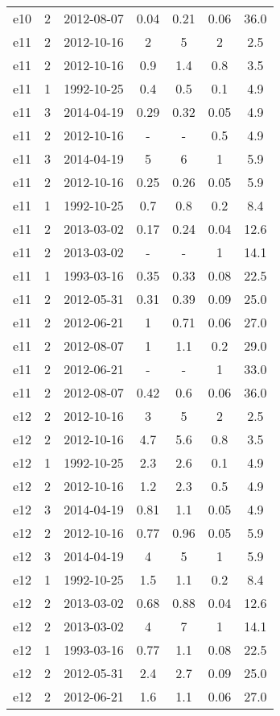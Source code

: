 \begin{table*}[htp]
\begin{tabular}{ccccccc}
e10 & 2 & 2012-08-07 & 0.04 & 0.21 & 0.06 & 36.0 \\
e11 & 2 & 2012-10-16 & 2 & 5 & 2 & 2.5 \\
e11 & 2 & 2012-10-16 & 0.9 & 1.4 & 0.8 & 3.5 \\
e11 & 1 & 1992-10-25 & 0.4 & 0.5 & 0.1 & 4.9 \\
e11 & 3 & 2014-04-19 & 0.29 & 0.32 & 0.05 & 4.9 \\
e11 & 2 & 2012-10-16 & - & - & 0.5 & 4.9 \\
e11 & 3 & 2014-04-19 & 5 & 6 & 1 & 5.9 \\
e11 & 2 & 2012-10-16 & 0.25 & 0.26 & 0.05 & 5.9 \\
e11 & 1 & 1992-10-25 & 0.7 & 0.8 & 0.2 & 8.4 \\
e11 & 2 & 2013-03-02 & 0.17 & 0.24 & 0.04 & 12.6 \\
e11 & 2 & 2013-03-02 & - & - & 1 & 14.1 \\
e11 & 1 & 1993-03-16 & 0.35 & 0.33 & 0.08 & 22.5 \\
e11 & 2 & 2012-05-31 & 0.31 & 0.39 & 0.09 & 25.0 \\
e11 & 2 & 2012-06-21 & 1 & 0.71 & 0.06 & 27.0 \\
e11 & 2 & 2012-08-07 & 1 & 1.1 & 0.2 & 29.0 \\
e11 & 2 & 2012-06-21 & - & - & 1 & 33.0 \\
e11 & 2 & 2012-08-07 & 0.42 & 0.6 & 0.06 & 36.0 \\
e12 & 2 & 2012-10-16 & 3 & 5 & 2 & 2.5 \\
e12 & 2 & 2012-10-16 & 4.7 & 5.6 & 0.8 & 3.5 \\
e12 & 1 & 1992-10-25 & 2.3 & 2.6 & 0.1 & 4.9 \\
e12 & 2 & 2012-10-16 & 1.2 & 2.3 & 0.5 & 4.9 \\
e12 & 3 & 2014-04-19 & 0.81 & 1.1 & 0.05 & 4.9 \\
e12 & 2 & 2012-10-16 & 0.77 & 0.96 & 0.05 & 5.9 \\
e12 & 3 & 2014-04-19 & 4 & 5 & 1 & 5.9 \\
e12 & 1 & 1992-10-25 & 1.5 & 1.1 & 0.2 & 8.4 \\
e12 & 2 & 2013-03-02 & 0.68 & 0.88 & 0.04 & 12.6 \\
e12 & 2 & 2013-03-02 & 4 & 7 & 1 & 14.1 \\
e12 & 1 & 1993-03-16 & 0.77 & 1.1 & 0.08 & 22.5 \\
e12 & 2 & 2012-05-31 & 2.4 & 2.7 & 0.09 & 25.0 \\
e12 & 2 & 2012-06-21 & 1.6 & 1.1 & 0.06 & 27.0 \\

\end{tabular}
\end{table*}
